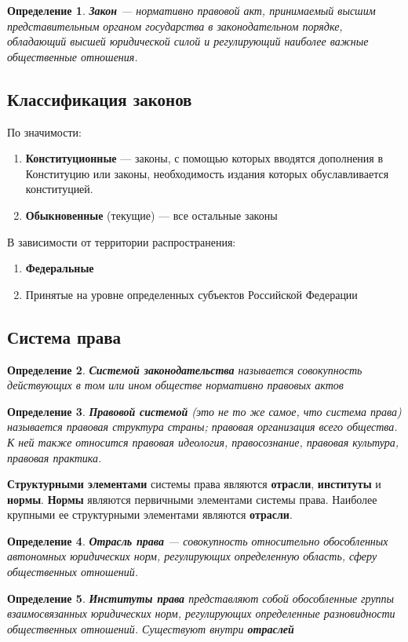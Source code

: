 \documentclass{article}
\newtheorem{definition}{Определение}
\begin{document}
\begin{definition}
    \textbf{Закон} — нормативно правовой акт, принимаемый высшим представительным органом государства в законодательном порядке, обладающий высшей юридической силой и регулирующий наиболее важные общественные отношения.
\end{definition}

\subsection{Классификация законов}

По значимости:

\begin{enumerate}
    \item \textbf{Конституционные} — законы, с помощью которых вводятся дополнения в Конституцию или законы, необходимость издания которых обуславливается конституцией.
    \item \textbf{Обыкновенные} (текущие) — все остальные законы
\end{enumerate}

В зависимости от территории распространения:

\begin{enumerate}
    \item \textbf{Федеральные}
    \item Принятые на уровне определенных субъектов Российской Федерации
\end{enumerate}

\subsection{Система права}

\begin{definition}
    \textbf{Системой законодательства} называется совокупность действующих в том или ином обществе нормативно правовых актов
\end{definition}

\begin{definition}
    \textbf{Правовой системой} (это не то же самое, что система права) называется правовая структура страны; правовая организация всего общества. К ней также относится правовая идеология, правосознание, правовая культура, правовая практика.
\end{definition}

\textbf{Структурными элементами} системы права являются \textbf{отрасли}, \textbf{институты} и \textbf{нормы}. \textbf{Нормы} являются первичными элементами системы права. Наиболее крупными ее структурными элементами являются \textbf{отрасли}.

\begin{definition}
    \textbf{Отрасль права} — совокупность относительно обособленных автономных юридических норм, регулирующих определенную область, сферу общественных отношений.
\end{definition}

\begin{definition}
    \textbf{Институты права} представляют собой обособленные группы взаимосвязанных юридических норм, регулирующих определенные разновидности общественных отношений. Существуют внутри \textbf{отраслей}
\end{definition}
\end{document}
